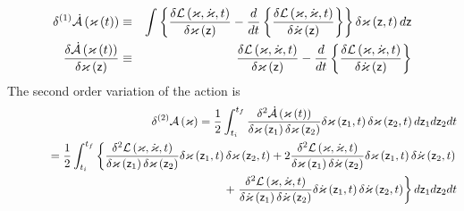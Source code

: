 \begin{eqnarray}
\delta ^{\left( 1\right) }{\cal \dot{A}}\left( \varkappa \left( t\right)
\right) &\equiv &\int \left\{ \frac{\delta {\cal L}\left( {\cal \varkappa },%
{\cal \dot{\varkappa}},t\right) }{\delta {\cal \varkappa }\left( {\sf z}%
\right) }-\frac{d}{dt}\left\{ \frac{\delta {\cal L}\left( {\cal \varkappa },%
{\cal \dot{\varkappa}},t\right) }{\delta {\cal \dot{\varkappa}}\left( {\sf z}%
\right) }\right\} \right\} \delta \varkappa \left( {\sf z},t\right) d{\sf z}
\nonumber \\
\frac{\delta {\cal \dot{A}}\left( \varkappa \left( t\right) \right) }{\delta
\varkappa \left( {\sf z}\right) } &\equiv &\frac{\delta {\cal L}\left( {\cal %
\varkappa },{\cal \dot{\varkappa}},t\right) }{\delta {\cal \varkappa }\left( 
{\sf z}\right) }-\frac{d}{dt}\left\{ \frac{\delta {\cal L}\left( {\cal %
\varkappa },{\cal \dot{\varkappa}},t\right) }{\delta {\cal \dot{\varkappa}}%
\left( {\sf z}\right) }\right\}
\end{eqnarray}%
The second order variation of the action is 
\begin{eqnarray}
&&\delta ^{\left( 2\right) }{\cal A}\left( \varkappa \right) =\frac{1}{2}%
\int_{t_{i}}^{t_{f}}\frac{\delta ^{2}{\cal \dot{A}}\left( \varkappa \left(
t\right) \right) }{\delta \varkappa \left( {\sf z}_{1}\right) \delta
\varkappa \left( {\sf z}_{2}\right) }\delta \varkappa \left( {\sf z}%
_{1},t\right) \delta \varkappa \left( {\sf z}_{2},t\right) d{\sf z}_{1}d{\sf %
z}_{2}dt  \nonumber \\
&&\left. {}\right. \quad \quad \,=\frac{1}{2}\int_{t_{i}}^{t_{f}}\left\{ 
\frac{\delta ^{2}{\cal L}\left( {\cal \varkappa },{\cal \dot{\varkappa}}%
,t\right) }{\delta \varkappa \left( {\sf z}_{1}\right) \delta \varkappa
\left( {\sf z}_{2}\right) }\delta \varkappa \left( {\sf z}_{1},t\right)
\delta \varkappa \left( {\sf z}_{2},t\right) +2\frac{\delta ^{2}{\cal L}%
\left( {\cal \varkappa },{\cal \dot{\varkappa}},t\right) }{\delta \varkappa
\left( {\sf z}_{1}\right) \delta \dot{\varkappa}\left( {\sf z}_{2}\right) }%
\delta \varkappa \left( {\sf z}_{1},t\right) \delta \dot{\varkappa}\left( 
{\sf z}_{2},t\right) \right.  \nonumber \\
&&\qquad \qquad \qquad \qquad \qquad \qquad \qquad \qquad \quad +\left. 
\frac{\delta ^{2}{\cal L}\left( {\cal \varkappa },{\cal \dot{\varkappa}}%
,t\right) }{\delta \dot{\varkappa}\left( {\sf z}_{1}\right) \delta \dot{%
\varkappa}\left( {\sf z}_{2}\right) }\delta \dot{\varkappa}\left( {\sf z}%
_{1},t\right) \delta \dot{\varkappa}\left( {\sf z}_{2},t\right) \right\} d%
{\sf z}_{1}d{\sf z}_{2}dt  \label{Avar2}
\end{eqnarray}%
